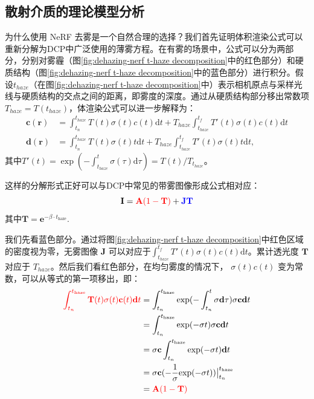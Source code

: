 \subsection{散射介质的理论模型分析}
为什么使用 NeRF 去雾是一个自然合理的选择？我们首先证明体积渲染公式可以重新分解为DCP\cite{kaiming_he_single_2009}中广泛使用的薄雾方程。在有雾的场景中，公式可以分为两部分，分别对雾霾（图\ref{fig:dehazing-nerf t-haze decomposition}中的红色部分）和硬质结构（图\ref{fig:dehazing-nerf t-haze decomposition}中的蓝色部分）进行积分。假设$t_{haze}$（在图\ref{fig:dehazing-nerf t-haze decomposition}中）表示相机原点与采样光线与硬质结构的交点之间的距离，即雾度的深度。通过从硬质结构部分移出常数项 $T_{haze} = T(t_{haze})$，体渲染公式可以进一步解释为：
\begin{align}
    \textbf{c}(\textbf{r}) &= \int_{t_n}^{t_{haze}}T(t)\sigma(t)c(t)\text{d}t + T_{haze}\int_{t_{haze}}^{t_f}T'(t)\sigma(t)c(t)\text{d}t\\
    \textbf{d}(\textbf{r}) &= \int_{t_n}^{t_{haze}}T(t)\sigma(t)t\text{d}t + T_{haze}\int_{t_{haze}}^{t_f}T'(t)\sigma(t)t\text{d}t,
\end{align}
其中$T'(t)=\exp(-\int_{t_{haze}}^{t}\sigma(\tau)\text{d}\tau)=T(t)/T_{t_{haze}}$。

这样的分解形式正好可以与DCP中常见的带雾图像形成公式相对应：
\begin{equation}
    \mathbf{I}= \textcolor{red}{\mathbf{A} (1-\mathbf{T})} + \textcolor{blue}{\mathbf{J} \mathbf{T}}
\end{equation}
其中$\mathbf{T}=\mathbf{e}^{-\beta \cdot t_\text{haze}}$.

我们先看蓝色部分。通过将图\ref{fig:dehazing-nerf t-haze decomposition}中红色区域的密度视为零，无雾图像 $\mathbf{J}$ 可以对应于$\int_{t_{haze}}^{t_f}T'(t)\sigma(t)c(t)\text{d}t$。累计透光度 $\mathbf{T}$ 对应于 ${T_{haze}}$。然后我们看红色部分，在均匀雾度的情况下， $σ(t)c(t)$ 变为常数，可以从等式的第一项移出，即：
\begin{align}
    \textcolor{red}{\int_{t_n}^{{t}_\text{haze}}\mathbf{T}(t){{\sigma}}(t){\mathbf{c}}(t)\mathbf{d}t} &= \int_{t_n}^{t_\text{haze}} \text{exp}(-\int_{t_n}^t {\sigma}\mathbf{d}\tau) {\sigma}{\mathbf{c}}\mathbf{d}t \\
    &=\int_{t_n}^{t_\text{haze}} \text{exp}(-{\sigma}t) {\sigma}{\mathbf{c}}\mathbf{d}t \\
    &={\sigma}{\mathbf{c}}\int_{t_n}^{t_\text{haze}} \text{exp}(-{\sigma}t) \mathbf{d}t \\
    &={\sigma}{\mathbf{c}}(-\frac{1}{{\sigma}}\text{exp}(-{\sigma}t))\big|_{t_n}^{t_\text{haze}} \\
    &=\textcolor{red}{\mathbf{A}(1-\mathbf{T})}
\end{align}

